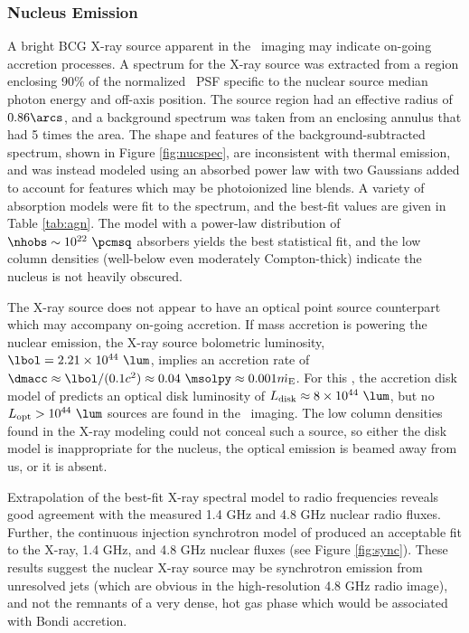 \documentclass[iop]{emulateapj}
\begin{document}
\subsubsection{Nucleus Emission}
\label{sec:nuc}

A bright BCG X-ray source apparent in the \cxo\ imaging may indicate
on-going accretion processes. A spectrum for the X-ray source was
extracted from a region enclosing 90\% of the normalized \cxo\ PSF
specific to the nuclear source median photon energy and off-axis
position. The source region had an effective radius of $0.86\arcs$,
and a background spectrum was taken from an enclosing annulus that had
5 times the area. The shape and features of the background-subtracted
spectrum, shown in Figure \ref{fig:nucspec}, are inconsistent with
thermal emission, and was instead modeled using an absorbed power law
with two Gaussians added to account for features which may be
photoionized line blends. A variety of absorption models were fit to
the spectrum, and the best-fit values are given in Table
\ref{tab:agn}. The model with a power-law distribution of $\nhobs \sim
10^{22} ~\pcmsq$ absorbers yields the best statistical fit, and the
low column densities (well-below even moderately Compton-thick)
indicate the nucleus is not heavily obscured.

The X-ray source does not appear to have an optical point source
counterpart which may accompany on-going accretion. If mass accretion
is powering the nuclear emission, the X-ray source bolometric
luminosity, $\lbol = 2.21 \times 10^{44} ~\lum$, implies an accretion
rate of $\dmacc \approx \lbol/(0.1 c^2) \approx 0.04 ~\msolpy \approx
0.001 \dme$. For this \dmacc, the accretion disk model of
\citet{2002NewAR..46..247M} predicts an optical disk luminosity of
$\ldisk \approx 8 \times 10^{44} ~\lum$, but no $L_{\rm{opt}} >
10^{44} ~\lum$ sources are found in the \hst\ imaging. The low column
densities found in the X-ray modeling could not conceal such a source,
so either the disk model is inappropriate for the nucleus, the optical
emission is beamed away from us, or it is absent.

Extrapolation of the best-fit X-ray spectral model to radio
frequencies reveals good agreement with the measured 1.4 GHz and 4.8
GHz nuclear radio fluxes. Further, the continuous injection
synchrotron model of \citet{1987MNRAS.225..335H} produced an
acceptable fit to the X-ray, 1.4 GHz, and 4.8 GHz nuclear fluxes (see
Figure \ref{fig:sync}). These results suggest the nuclear X-ray source
may be synchrotron emission from unresolved jets (which are obvious in
the high-resolution 4.8 GHz radio image), and not the remnants of a
very dense, hot gas phase which would be associated with Bondi
accretion.
\end{document}
